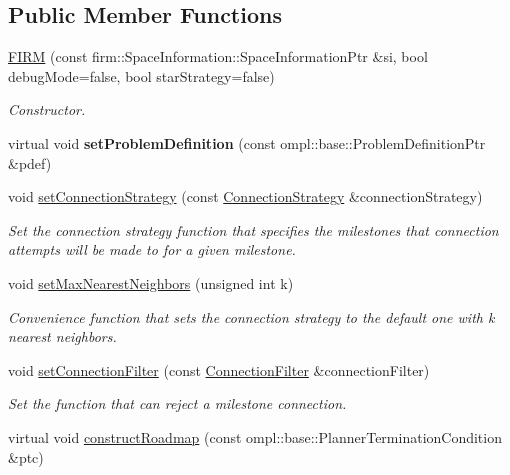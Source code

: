 \subsection*{\-Public \-Member \-Functions}
\begin{DoxyCompactItemize}
\item 
\hypertarget{class_f_i_r_m_a45dfdcb347763c633bf46ee653c35ce9}{\hyperlink{class_f_i_r_m_a45dfdcb347763c633bf46ee653c35ce9}{\-F\-I\-R\-M} (const firm\-::\-Space\-Information\-::\-Space\-Information\-Ptr \&si, bool debug\-Mode=false, bool star\-Strategy=false)}\label{class_f_i_r_m_a45dfdcb347763c633bf46ee653c35ce9}

\begin{DoxyCompactList}\small\item\em \-Constructor. \end{DoxyCompactList}\item 
\hypertarget{class_f_i_r_m_a09a7ff97d8202a82ca7f6dddfd7ba185}{virtual void {\bfseries set\-Problem\-Definition} (const ompl\-::base\-::\-Problem\-Definition\-Ptr \&pdef)}\label{class_f_i_r_m_a09a7ff97d8202a82ca7f6dddfd7ba185}

\item 
void \hyperlink{class_f_i_r_m_a8017d1847e682f39c2cbce33e904af57}{set\-Connection\-Strategy} (const \hyperlink{class_f_i_r_m_a15cfbcaf52c0bdd5e6c1a969bbf7ea1e}{\-Connection\-Strategy} \&connection\-Strategy)
\begin{DoxyCompactList}\small\item\em \-Set the connection strategy function that specifies the milestones that connection attempts will be made to for a given milestone. \end{DoxyCompactList}\item 
\hypertarget{class_f_i_r_m_a2a87b6c094c21b956a469a2b69cd387c}{void \hyperlink{class_f_i_r_m_a2a87b6c094c21b956a469a2b69cd387c}{set\-Max\-Nearest\-Neighbors} (unsigned int k)}\label{class_f_i_r_m_a2a87b6c094c21b956a469a2b69cd387c}

\begin{DoxyCompactList}\small\item\em \-Convenience function that sets the connection strategy to the default one with k nearest neighbors. \end{DoxyCompactList}\item 
void \hyperlink{class_f_i_r_m_a3f85ba51a7c3b62b75df7f7c16064cec}{set\-Connection\-Filter} (const \hyperlink{class_f_i_r_m_a2482eee2e5248d5bff3b3b56e5a593b3}{\-Connection\-Filter} \&connection\-Filter)
\begin{DoxyCompactList}\small\item\em \-Set the function that can reject a milestone connection. \end{DoxyCompactList}\item 
\hypertarget{class_f_i_r_m_a5f2e6a8c5dac3a0629f1dd0ac2313b9c}{virtual void \hyperlink{class_f_i_r_m_a5f2e6a8c5dac3a0629f1dd0ac2313b9c}{construct\-Roadmap} (const ompl\-::base\-::\-Planner\-Termination\-Condition \&ptc)}\label{class_f_i_r_m_a5f2e6a8c5dac3a0629f1dd0ac2313b9c}


\end{DoxyCompactItemize}
